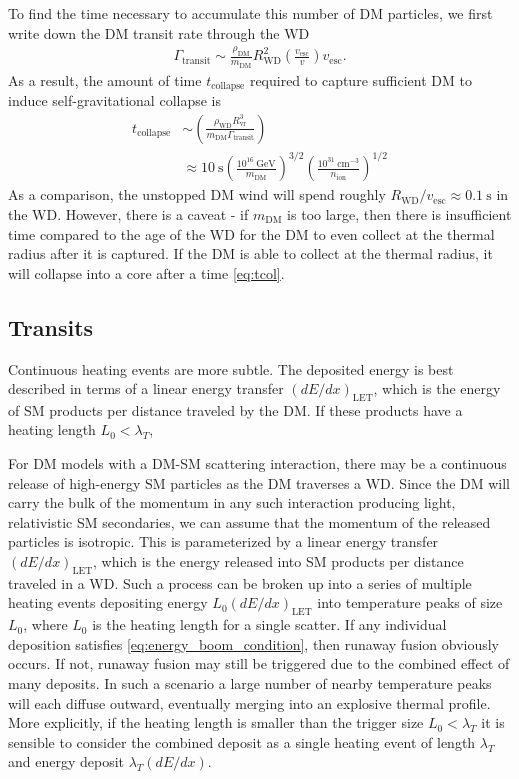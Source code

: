 \documentclass[twocolumn,preprintnumbers,amsmath,amssymb,prd, superscriptaddress]{revtex4} %
\newcommand{\GeV}{\text{GeV}}
\newcommand{\cm}{\text{cm}}
\def\r{\right)}
\def\l{\left(}
\begin{document}
To find the time necessary to accumulate this number of DM particles, we first write down the DM transit rate through the WD
\begin{align}
\Gamma_\text{transit} \sim \frac{\rho_{\text{DM}}}{m_\text{DM}} R_\text{WD}^2 \l\frac{v_\text{esc}}{v}\r v_\text{esc}.
\label{eq:TransitFluxCondition}
\end{align}
As a result, the amount of time $t_\text{collapse}$ required to capture sufficient DM to induce self-gravitational collapse is
\begin{align}
\label{eq:tcol}
t_\text{collapse} &\sim \l \frac{\rho_\text{WD} R_\text{vr}^3}{m_\text{DM} \Gamma_\text{transit}} \r \nonumber\\
 &\approx 10 ~\text{s} \l \frac{10^{16} ~\GeV}{m_\text{DM}} \r^{3/2} \l \frac{10^{31} ~\cm^{-3}}{n_\text{ion}}\r^{1/2}
\end{align}
As a comparison, the unstopped DM wind will spend roughly $R_\text{WD}/v_\text{esc} \approx 0.1 ~\text{s}$ in the WD.
However, there is a caveat - if $m_\text{DM}$ is too large, then there is insufficient time compared to the age of the WD for the DM to even collect at the thermal radius after it is captured.
If the DM is able to collect at the thermal radius, it will collapse into a core after a time \eqref{eq:tcol}.


\subsection{Transits}
Continuous heating events are more subtle.
The deposited energy is best described in terms of a linear energy transfer $(dE/dx)_\text{LET}$, which is the energy of SM products per distance traveled by the DM.
If these products have a heating length $L_0 < \lambda_T$,

For DM models with a DM-SM scattering interaction, there may be a continuous release of high-energy SM particles as the DM traverses a WD.
Since the DM will carry the bulk of the momentum in any such interaction producing light, relativistic SM secondaries, we can assume that the momentum of the released particles is isotropic.
This is parameterized by a linear energy transfer $(dE/dx)_\text{LET}$, which is the energy released into SM products per distance traveled in a WD.
Such a process can be broken up into a series of multiple heating events depositing energy $L_0 (d E/d x)_\text{LET}$ into temperature peaks of size $L_0$, where $L_0$ is the heating length for a single scatter.
If any individual deposition satisfies \eqref{eq:energy_boom_condition}, then runaway fusion obviously occurs.
If not, runaway fusion may still be triggered due to the combined effect of many deposits.
In such a scenario a large number of nearby temperature peaks will each diffuse outward, eventually merging into an explosive thermal profile.
More explicitly, if the heating length is smaller than the trigger size $L_0 < \lambda_T$ it is sensible to consider the combined deposit as a single heating event of length $\lambda_T$ and energy deposit $\lambda_T (d E/d x)$.
\end{document}
